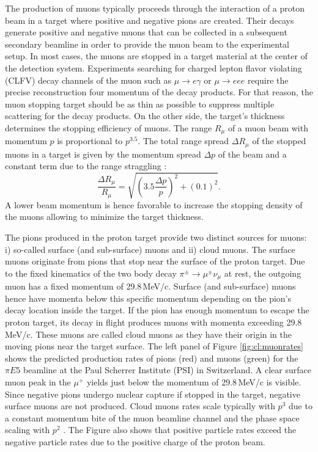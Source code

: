 The production of muons typically proceeds through the interaction of a proton beam in a target where positive and negative pions are created. Their decays generate positive and negative muons that can be collected in a subsequent secondary beamline in order to provide the muon beam to the experimental setup. In most cases, the muons are stopped in a target material at the center of the detection system. Experiments searching for charged lepton flavor violating (CLFV) decay channels of the muon such as $\mu\to e \gamma$ or $\mu \to e e e$ require the precise reconstruction four momentum of the decay products. For that reason, the muon stopping target should be as thin as possible to suppress multiple scattering for the decay products. On the other side, the target's thickness determines the stopping efficiency of muons. The range $R_\mu$ of a muon beam with momentum $p$ is proportional to $p^{3.5}$. The total range spread $\Delta R_\mu$ of the stopped muons in a target is given by the momentum spread $\Delta p$ of the beam and a constant term due to the range straggling \cite{Pifer:1976ia}:
\[
\frac{\Delta R_\mu}{R_\mu} = \sqrt{\left(3.5\frac{\Delta p}{p}\right)^2 + \left(0.1\right)^2}.
\]
A lower beam momentum is hence favorable to increase the stopping density of the muons allowing to minimize the target thickness. 

The pions produced in the proton target provide two distinct sources for muons: i) so-called surface (and sub-surface) muons and ii) cloud muons. The surface muons originate from pions that stop near the surface of the proton target. Due to the fixed kinematics of the two body decay $\pi^\pm \to \mu^\pm \nu_\mu$ at rest, the outgoing muon has a fixed momentum of 29.8\,MeV/c. Surface (and sub-surface) muons hence have momenta below this specific momentum depending on the pion's decay location inside the target. If the pion has enough momentum to escape the proton target, its decay in flight produces muons with momenta exceeding 29.8\,MeV/c. These muons are called cloud muons as they have their origin in the moving pions near the target surface. The left panel of Figure \ref{fig:cl:muonrates} shows the predicted production rates of pions (red) and muons (green) for the $\pi E5$ beamline at the Paul Scherrer Institute (PSI) in Switzerland. A clear surface muon peak in the $\mu^+$ yields just below the momentum of 29.8\,MeV/c is visible. Since negative pions undergo nuclear capture if stopped in the target, negative surface muons are not produced. Cloud muons rates scale typically with $p^3$ due to a constant momentum bite of the muon beamline channel and the phase space scaling with $p^2$ \cite{VanDyck:1979xr}. The Figure also shows that positive particle rates exceed the negative particle rates due to the positive charge of the proton beam.  

